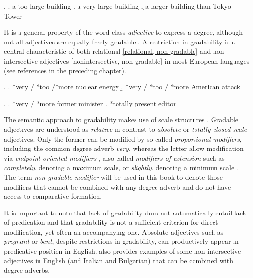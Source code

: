 \ex. \a. a too large building \label{toolarge}
\b. a very large building \label{verylarge}
\c. a larger building than Tokyo Tower \label{thanlarge}

It is a general property of the word class \textit{adjective} to express a degree, although not all adjectives are equally freely gradable \citep[70–74]{dixon:2010:grammatical}. A restriction in gradability is a central characteristic of both relational \ref{relational, non-gradable} and non-intersective adjectives \ref{nonintersective, non-gradable} in most European languages (see references in the preceding chapter).

\ex. \label{relational, non-gradable} \a. *very / *too /*more nuclear energy
\b. *very / *too / *more American attack

\ex. \label{nonintersective, non-gradable} \a. *very / *more former minister
\b. *totally present editor

The semantic approach to gradability makes use of scale structures \citep{kennedy:2005:scale, kennedy:2007:vagueness, morzycki:2012:adj}. Gradable adjectives are understood as \textit{relative} in contrast to \textit{absolute} or \textit{totally closed scale} adjectives. Only the former can be modified by so-called \textit{proportional modifiers}, including the common degree adverb \textit{very}, whereas the latter allow modification via \textit{endpoint-oriented modifiers} \citep{kennedy:2005:scale}, also called \textit{modifiers of extension} \citep{fabregas:2014:adjectival} such as \textit{completely}, denoting a maximum scale, or \textit{slightly}, denoting a minimum scale \citep[355]{kennedy:2005:scale}. The term \textit{non-gradable modifier} will be used in this book to denote those modifiers that cannot be combined with any degree adverb and do not have access to comparative-formation.

It is important to note that lack of gradability does not automatically entail lack of predication and that gradability is not a sufficient criterion for direct modification, yet often an accompanying one. Absolute adjectives such as \textit{pregnant} or \textit{bent}, despite restrictions in gradability, can productively appear in predicative position in English. \citet{cinque:2010:adj} also provides examples of some non-intersective adjectives in  English (and  Italian and  Bulgarian) that can be combined with degree adverbs.

